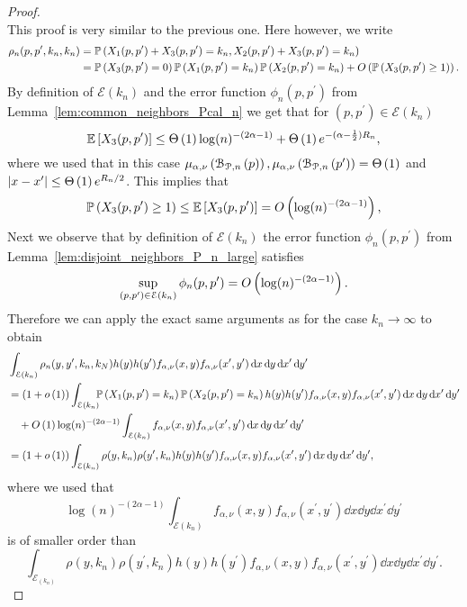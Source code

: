 \begin{proof}
\\
This proof is very similar to the previous one. Here however, we write
\begin{align*}
	\rho_{n}(p,p^\prime,k_n,k_n) &= \mathbb{P}\left(X_1(p,p^\prime) + X_3(p,p^\prime) = k_n, X_2(p,p^\prime) + X_3(p,p^\prime) = k_n\right)\\
	&= \mathbb{P}\left(X_3(p,p^\prime) = 0\right)\mathbb{P}\left(X_1(p,p^\prime) = k_n\right)\mathbb{P}\left(X_2(p,p^\prime) = k_n\right) 
		+ O\left(\mathbb{P}\left(X_3(p,p^\prime) \ge 1\right)\right).
\end{align*}
By definition of $\mathcal{E}(k_n)$ and the error function $\phi_n(p,p^\prime)$ from Lemma~\ref{lem:common_neighbors_Pcal_n} we get that for $(p,p^\prime) \in \mathcal{E}(k_n)$
\[
	\mathbb{E}\left[X_3(p,p^\prime)\right] \le \Theta\left(1\right) \log(n)^{-(2\alpha - 1)} + \Theta\left(1\right)e^{-(\alpha - \frac{1}{2})R_n},
\]
where we used that in this case $\mu_{\alpha,\nu}\left({\mathcal B}_{{\mathcal P},n}\left(p\right)\right), \mu_{\alpha,\nu}\left({\mathcal B}_{{\mathcal P},n}\left(p^\prime\right)\right) = \Theta\left(1\right)$ and $|x-x^\prime| \le \Theta\left(1\right) e^{R_n/2}$. This implies that
\[
	\mathbb{P}\left(X_3(p,p^\prime) \ge 1\right) \le \mathbb{E}\left[X_{3}(p,p^\prime)\right] = O\left(\log(n)^{-(2\alpha - 1)}\right),
\] 
Next we observe that by definition of $\mathcal{E}(k_n)$ the error function $\phi_n(p,p^\prime)$ from Lemma~\ref{lem:disjoint_neighbors_P_n_large} satisfies
\[
	\sup_{(p,p^\prime) \in \mathcal{E}(k_n)} \phi_n(p,p^\prime) = O\left(\log(n)^{-(2\alpha - 1)}\right).
\]
Therefore we can apply the exact same arguments as for the case $k_n \to \infty$ to obtain
\begin{align*}
	&\int_{\mathcal{E}(k_n)} \rho_n(y,y^\prime,k_n,k_N) h(y)h(y^\prime) 
		f_{\alpha,\nu}(x,y)	f_{\alpha,\nu}(x^\prime,y^\prime) \dd x \dd y \dd x^\prime \dd y^\prime\\
	&=(1+\smallO{1})\int_{\mathcal{E}(k_n)} \hspace{-5pt}\Prob{X_1(p,p^\prime) = k_n}\Prob{X_2(p,p^\prime) = k_n} h(y) h(y^\prime) 	
		f_{\alpha,\nu}(x,y)f_{\alpha,\nu}(x^\prime,y^\prime) \dd x \dd y \dd x^\prime \dd y^\prime\\
	&\hspace{10pt}+ \bigO{1}\log(n)^{-(2\alpha - 1)} \int_{\mathcal{E}(k_n)}
		f_{\alpha,\nu}(x,y)	f_{\alpha,\nu}(x^\prime,y^\prime) \dd x \dd y \dd x^\prime \dd y^\prime\\
	&= (1+\smallO{1})\int_{\mathcal{E}(k_n)} \rho(y,k_n) \rho(y^\prime,k_n) h(y)h(y^\prime) 
		f_{\alpha,\nu}(x,y)	f_{\alpha,\nu}(x^\prime,y^\prime) \dd x \dd y \dd x^\prime \dd y^\prime,
\end{align*}
where we used that
\[
	\log(n)^{-(2\alpha - 1)}\int_{\mathcal{E}(k_n)}
			f_{\alpha,\nu}(x,y)	f_{\alpha,\nu}(x^\prime,y^\prime) \dd x \dd y \dd x^\prime \dd y^\prime
\]
is of smaller order than
\[
	\int_{\mathcal{E}_(k_n)} \rho(y,k_n) \rho(y^\prime,k_n) h(y)h(y^\prime) 
			f_{\alpha,\nu}(x,y)	f_{\alpha,\nu}(x^\prime,y^\prime) \dd x \dd y \dd x^\prime \dd y^\prime.
\]
\end{proof}


